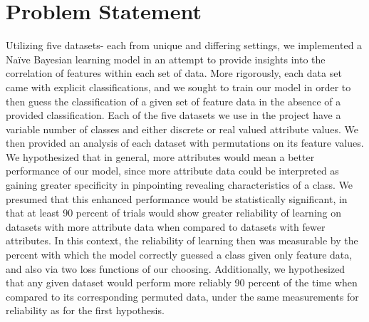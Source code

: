 \documentclass[twoside,11pt]{article}
\begin{document}
\section{Problem Statement}
Utilizing five datasets- each from unique and differing settings, we implemented a
 Na{\"i}ve Bayesian learning model in an attempt to provide insights into the correlation 
 of features within each set of data. More rigorously, each data set came with explicit classifications,
  and we sought to train our model in order to then guess the classification of a given set of feature data
  in the absence of a provided classification. Each of the five datasets we use in the project have a variable 
  number of classes and either discrete or real valued attribute values. We then provided an analysis of each
  dataset with permutations on its feature values. We hypothesized that in general, more attributes would mean
  a better performance of our model, since more attribute data could be interpreted as gaining greater specificity in
  pinpointing revealing characteristics of a class. We presumed that this enhanced performance would be statistically
  significant, in that at least 90 percent of trials would show greater reliability of learning on datasets with more attribute data 
  when compared to datasets with fewer attributes. In this context, the reliability of learning then was measurable by the percent with which the
  model correctly guessed a class given only feature data, and also via two loss functions of our choosing. Additionally, we
  hypothesized that any given dataset would perform more reliably 90 percent of the time when compared to its corresponding permuted
  data, under the same measurements for reliability as for the first hypothesis. 
\end{document}
